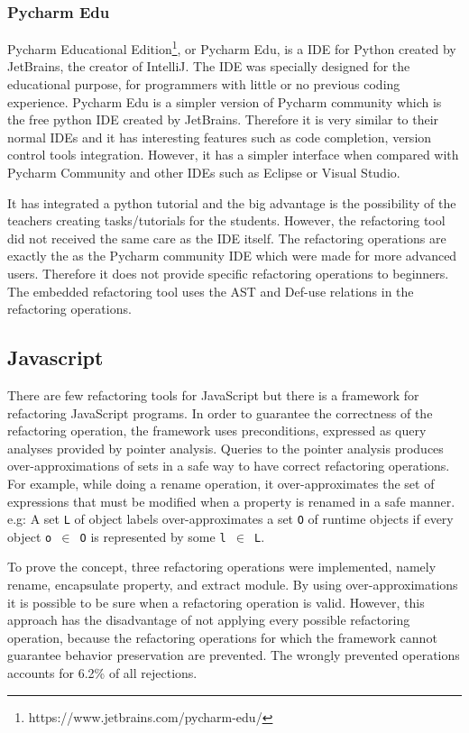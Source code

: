 \subsubsection{Pycharm Edu}
Pycharm Educational Edition\footnote{https://www.jetbrains.com/pycharm-edu/},
 or Pycharm Edu, is a IDE for Python created by JetBrains,
the creator of IntelliJ.
The IDE was specially designed for the educational purpose, for programmers
with little or no previous coding experience.
Pycharm Edu is a simpler version of Pycharm community which is the free
python IDE created by JetBrains.
Therefore it is very similar to their normal IDEs and it has interesting features
such as code completion, version control tools integration.
However, it has a simpler interface when compared with
Pycharm Community and other IDEs such as Eclipse or Visual Studio. %

It has integrated a python tutorial and the big advantage is the possibility of
the teachers creating tasks/tutorials for the students.
However, the refactoring tool did not received the same care as the IDE itself.
The refactoring operations are exactly the as the Pycharm community IDE which were made
for more advanced users.
Therefore it does not provide specific refactoring operations to beginners.
The embedded refactoring tool uses the AST and Def-use relations in the refactoring
operations.

\subsection{Javascript}
There are few refactoring tools for JavaScript but there is a framework
\cite{feldthaus2011tool} for refactoring JavaScript programs. %
In order to guarantee the correctness of the refactoring operation, the framework
uses preconditions, expressed as query analyses provided by pointer analysis. %
Queries to the pointer analysis produces over-approximations of sets in a safe way to
have correct refactoring operations.
For example, while doing a rename operation, it over-approximates the set of expressions
that must be modified when a property is renamed in a safe manner.
e.g: A set {\tt L} of object labels over-approximates a set {\tt O} of runtime objects if every
object {\tt o $\in$ O} is represented by some {\tt l $\in$ L}.

To prove the concept, three refactoring operations were implemented, namely rename,
encapsulate property, and extract module.
By using over-approximations it is possible to be sure when a refactoring
operation is valid.
However, this approach has the disadvantage of not applying every possible refactoring operation,
because the refactoring operations for which the framework cannot guarantee behavior
preservation are prevented.
The wrongly prevented operations accounts for 6.2\% of all rejections.
